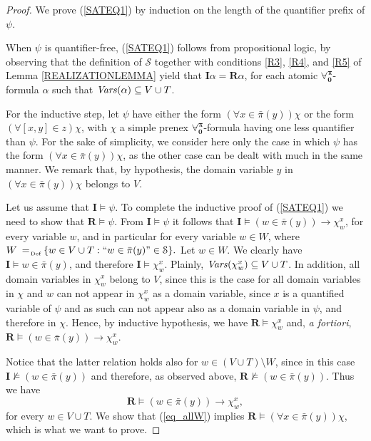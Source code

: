 \documentclass[a4paper,UKenglish]{lipics}
\newcommand{\Lang}{\ensuremath{\mathbf{\forall_{0}^{\pi}}}\xspace}
\newcommand{\nonpairs}[1]{\bar{\pi}(#1)}
\newcommand{\inter}{\ensuremath{\mathbf{I}}\xspace}
\newcommand{\atset}{\mathcal{S}}
\newcommand{\aslit}[1]{\mbox{``}#1\mbox{''}}
\newcommand{\real}{\mathbf{R}}
\begin{document}
\begin{proof}
We prove (\ref{SATEQ1}) by induction on the length of the quantifier prefix
of $\psi$.

When $\psi$ is quantifier-free, (\ref{SATEQ1}) follows from
propositional logic, by observing that the definition of $\atset$
together with conditions \ref{R3}, \ref{R4}, and \ref{R5} of Lemma
\ref{REALIZATIONLEMMA} yield that $\inter \alpha = \real \alpha$, for
each atomic \Lang-formula $\alpha$ such that $\mathit{Vars}(\alpha) \subseteq
V \cup T$.

For the inductive step, let $\psi$ have either the form $(\forall x
\in \nonpairs{y})\chi$ or the form $(\forall [x,y] \in z)\chi$, with
$\chi$ a simple prenex \Lang-formula having one less quantifier than
$\psi$.  For the sake of simplicity, we consider here only the case in
which $\psi$ has the form $(\forall x \in \nonpairs{y})\chi$, as the
other case can be dealt with much in the same manner.  We remark that,
by hypothesis, the domain variable $y$ in $(\forall x \in
\nonpairs{y})\chi$ belongs to $V$.

Let us assume that $\inter \models \psi$.  To complete the inductive
proof of (\ref{SATEQ1}) we need to show that $\real \models \psi$.  From $\inter \models
\psi$ it follows that $\inter \models (w \in \nonpairs{y}) \rightarrow
\chi_w^x$, for every variable $w$, and in particular for every
variable $w \in W$, where
$
 W \defAs \{ w \in V \cup T : \aslit{w \in \nonpairs{y}} \in \atset\}.
$
Let $w \in W$.  We clearly have $\inter \models w \in \nonpairs{y}$,
and therefore $\inter \models \chi_w^x$.  Plainly, $\mathit{Vars}(\chi_w^x)
\subseteq V \cup T$.  In addition, all domain variables in $\chi_w^x$
belong to $V$, since this is the case for all domain variables in
$\chi$ and $w$ can not appear in $\chi_w^x$ as a domain variable,
since $x$ is a quantified variable of $\psi$ and as such can not
appear also as a domain variable in $\psi$, and therefore in $\chi$.
Hence, by inductive hypothesis, we have $\real \models \chi_w^x$ and,
\emph{a fortiori}, $\real \models (w \in \nonpairs{y}) \rightarrow
\chi_w^x$.

Notice that the latter relation holds also for $w \in (V \cup T)
\setminus W$, since in this case $\inter \not\models (w \in
\nonpairs{y})$ and therefore, as observed above, $\real \not\models (w
\in \nonpairs{y})$.  Thus we have
\begin{equation}
    \label{eq_allW}
    \real \models (w \in \nonpairs{y}) \rightarrow \chi_w^x,
\end{equation}
for every $w \in V \cup T$.  We show that (\ref{eq_allW}) implies
$\real \models (\forall x \in \nonpairs{y})\chi$, which is what we
want to prove.


\end{proof}
\end{document}
